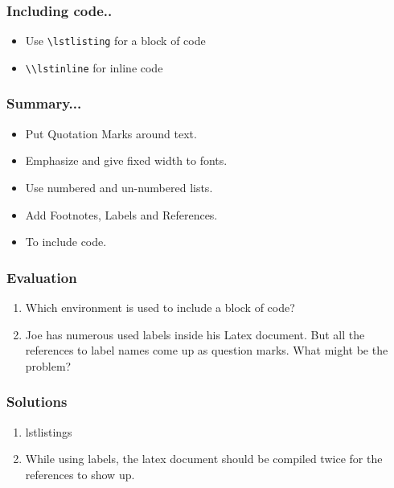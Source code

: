 \documentclass[17pt,compress]{beamer}
\newcommand{\typ}[1]{\lstinline{#1}}
\begin{document}
\begin{frame}[fragile]
  \frametitle{Including code..}
  \begin{itemize}
  \item Use \lstinline+\lstlisting+ for a block of code
  \item \typ{\\lstinline} for inline code
  \end{itemize}
\end{frame}


\begin{frame}[fragile]
	\frametitle{Summary...}
	\begin{itemize}
	\item Put Quotation Marks around text.
	\item Emphasize and give fixed width to fonts.
	\item Use numbered and un-numbered lists.
	\item Add Footnotes, Labels and References.
	\item To include code.
	\end{itemize}
\end{frame}

\begin{frame}[fragile]
\frametitle{Evaluation}
\begin{enumerate}
\item Which environment is used to include a block of code?
\item Joe has numerous used labels inside his Latex document. 
But all the references to label names come up as question marks.
What might be the problem? 
\end{enumerate}
\end{frame}
\begin{frame}

\frametitle{Solutions}
\begin{enumerate}
\item lstlistings
\vspace{15pt}
\item While using labels, the latex document should be compiled 
twice for the references to show up.
\end{enumerate}
\end{frame}
\end{document}
